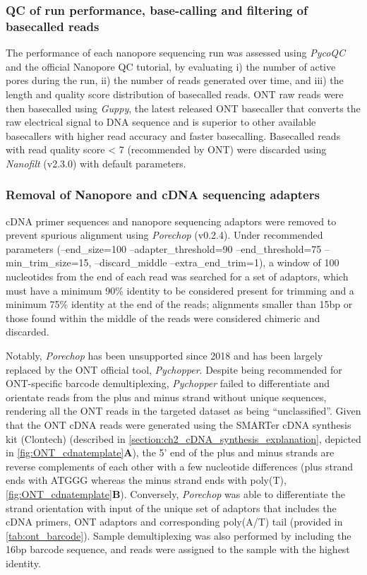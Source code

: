 \clearpage
\subsubsection{QC of run performance, base-calling and filtering of basecalled reads}
The performance of each nanopore sequencing run was assessed using \textit{PycoQC}\cite{Leger2019} and the official Nanopore QC tutorial\cite{ONT2019NanoporeQC}, by evaluating i) the number of active pores during the run, ii) the number of reads generated over time, and iii) the length and quality score distribution of basecalled reads. ONT raw reads were then basecalled using \textit{Guppy}, the latest released ONT basecaller that converts the raw electrical signal to DNA sequence and is superior to other available basecallers with higher read accuracy and faster basecalling\cite{Wick2019}. Basecalled reads with read quality score < 7 (recommended by ONT) were discarded using \textit{Nanofilt}\cite{DeCoster2018} (v2.3.0) with default parameters.

\subsubsection{Removal of Nanopore and cDNA sequencing adapters}
cDNA primer sequences and nanopore sequencing adaptors were removed to prevent spurious alignment using \textit{Porechop}\cite{Wick2017} (v0.2.4). Under recommended parameters (--end\_size=100 --adapter\_threshold=90 --end\_threshold=75 --min\_trim\_size=15, --discard\_middle --extra\_end\_trim=1), a window of 100 nucleotides from the end of each read was searched for a set of adaptors, which must have a minimum 90\% identity to be considered present for trimming and a minimum 75\% identity at the end of the reads; alignments smaller than 15bp or those found within the middle of the reads were considered chimeric and discarded. 

Notably, \textit{Porechop} has been unsupported since 2018 and has been largely replaced by the ONT official tool, \textit{Pychopper}\cite{OxfordNanoporePychopper}. Despite being recommended for ONT-specific barcode demultiplexing, \textit{Pychopper} failed to differentiate and orientate reads from the plus and minus strand without unique sequences, rendering all the ONT reads in the targeted dataset as being “unclassified”. Given that the ONT cDNA reads were generated using the SMARTer cDNA synthesis kit (Clontech) (described in \cref{section:ch2_cDNA_synthesis_explanation}, depicted in \cref{fig:ONT_cdnatemplate}\textbf{A}), the 5’ end of the plus and minus strands are reverse complements of each other with a few nucleotide differences (plus strand ends with ATGGG whereas the minus strand ends with poly(T), \cref{fig:ONT_cdnatemplate}\textbf{B}). Conversely, \textit{Porechop} was able to differentiate the strand orientation with input of the unique set of adaptors that includes the cDNA primers, ONT adaptors and corresponding poly(A/T) tail (provided in \cref{tab:ont_barcode}). Sample demultiplexing was also performed by including the 16bp barcode sequence, and reads were assigned to the sample with the highest identity. 

